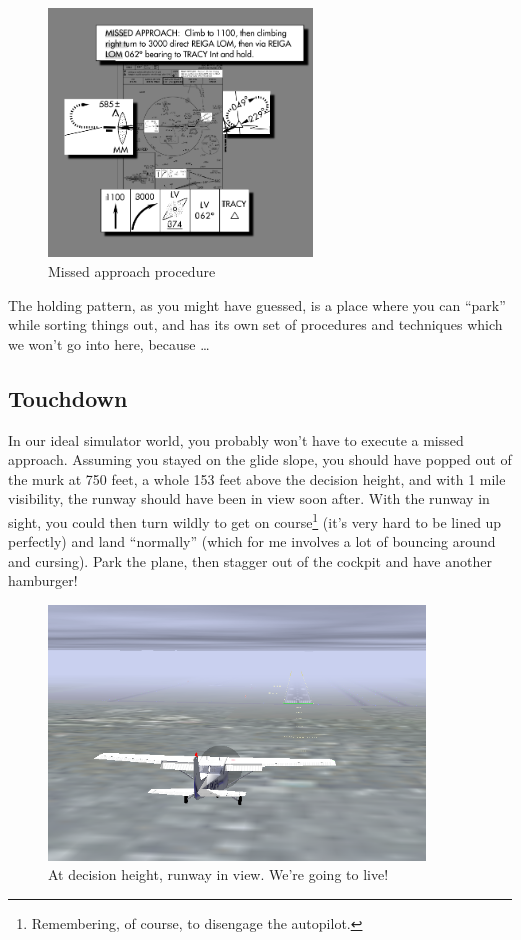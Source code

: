 \begin{figure}
  \begin{center}
    \includegraphics[width=7cm]{img/MAP}
    \caption{Missed approach procedure}
    \label{fig:MAP}
  \end{center}
\end{figure}

The holding pattern, as you might have guessed, is a place where you
can ``park'' while sorting things out, and has its own set of
procedures and techniques which we won't go into here, because
\ldots{}

\subsection{Touchdown}

In our ideal simulator world, you probably won't have to execute a
missed approach.  Assuming you stayed on the glide slope, you should
have popped out of the murk at 750 feet, a whole 153 feet above the
decision height, and with 1 mile visibility, the runway should have
been in view soon after.  With the runway in sight, you could then
turn wildly to get on course\footnote{Remembering, of course, to
  disengage the autopilot.}  (it's very hard to be lined up perfectly)
and land ``normally'' (which for me involves a lot of bouncing around
and cursing).  Park the plane, then stagger out of the cockpit and
have another hamburger!

\begin{figure}
  \begin{center}
    \includegraphics[width=10cm]{img/DH_plane_clipped}
    \caption{At decision height, runway in view.  We're going to live!}
    \label{fig:DH_plane_clipped}
  \end{center}
\end{figure}

